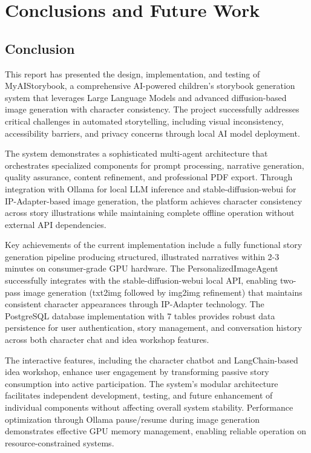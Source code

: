 \chapter{Conclusions and Future Work}

\section{Conclusion}

This report has presented the design, implementation, and testing of MyAIStorybook, a comprehensive AI-powered children's storybook generation system that leverages Large Language Models and advanced diffusion-based image generation with character consistency. The project successfully addresses critical challenges in automated storytelling, including visual inconsistency, accessibility barriers, and privacy concerns through local AI model deployment.

The system demonstrates a sophisticated multi-agent architecture that orchestrates specialized components for prompt processing, narrative generation, quality assurance, content refinement, and professional PDF export. Through integration with Ollama for local LLM inference and stable-diffusion-webui for IP-Adapter-based image generation, the platform achieves character consistency across story illustrations while maintaining complete offline operation without external API dependencies.

Key achievements of the current implementation include a fully functional story generation pipeline producing structured, illustrated narratives within 2-3 minutes on consumer-grade GPU hardware. The PersonalizedImageAgent successfully integrates with the stable-diffusion-webui local API, enabling two-pass image generation (txt2img followed by img2img refinement) that maintains consistent character appearances through IP-Adapter technology. The PostgreSQL database implementation with 7 tables provides robust data persistence for user authentication, story management, and conversation history across both character chat and idea workshop features.

The interactive features, including the character chatbot and LangChain-based idea workshop, enhance user engagement by transforming passive story consumption into active participation. The system's modular architecture facilitates independent development, testing, and future enhancement of individual components without affecting overall system stability. Performance optimization through Ollama pause/resume during image generation demonstrates effective GPU memory management, enabling reliable operation on resource-constrained systems.


